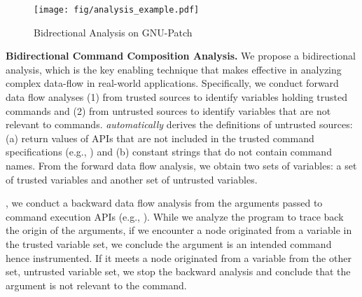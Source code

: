 \begin{figure}[!tp]
    \centering
    \vspace{0.5em}
    \texttt{[image: fig/analysis\_example.pdf]}
    \vspace{-1em}
    \caption{Bidrectional Analysis on GNU-Patch~\cite{Patch}}
    \vspace{-1.5em}
    \label{fig:Code_Patch}
\end{figure}

\noindent
{\bf Bidirectional Command Composition Analysis.}
We propose a bidirectional analysis, which is the key enabling technique that makes \sysname effective in analyzing complex data-flow in real-world applications.
Specifically, we conduct forward data flow analyses (1) from trusted sources to identify variables holding trusted commands and  (2) from untrusted sources to identify variables that are not relevant to commands. \sysname \emph{automatically} derives the definitions of untrusted sources: (a) return values of APIs that are not included in the trusted command specifications (e.g., ) and (b) constant strings that do not contain command names. 
From the forward data flow analysis, we obtain two sets of variables: a set of trusted variables and another set of untrusted variables.

, we conduct a backward data flow analysis from the arguments passed to command execution APIs (e.g., ). While we analyze the program to trace back the origin of the arguments, if we encounter a node originated from a variable in the trusted variable set, we conclude the argument is an intended command hence instrumented. If it meets a node originated from a variable from the other set, untrusted variable set, we stop the backward analysis and conclude that the argument is not relevant to the command. %


